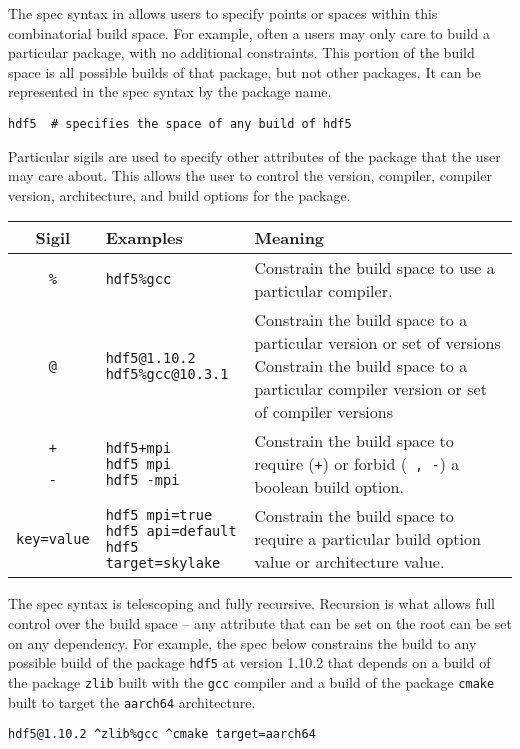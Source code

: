 The spec syntax in \spack allows users to specify points or spaces within this combinatorial build space.
For example, often a users may only care to build a particular package, with no additional constraints.
This portion of the build space is all possible builds of that package, but not other packages.
It can be represented in the spec syntax by the package name.
\begin{verbatim}
hdf5  # specifies the space of any build of hdf5
\end{verbatim}
Particular sigils are used to specify other attributes of the package that the user may care about. This allows the user to control the version, compiler, compiler version, architecture, and build options for the package.
\begin{tabular}{cll}
\hline
Sigil & Examples & Meaning \\
\hline
\texttt{\%} & \texttt{hdf5\%gcc} & Constrain the build space to use a particular compiler. \\
\hline
\texttt{@} & \shortstack{\texttt{hdf5@1.10.2} \\ \texttt{hdf5\%gcc@10.3.1}} & \shortstack{Constrain the build space to a particular version or set of versions \\ Constrain the build space to a particular compiler version or set of compiler versions} \\
\hline
\shortstack{\texttt{+} \\ \texttt{~} \\ \texttt{-}} & \shortstack{\texttt{hdf5+mpi} \\ \texttt{hdf5~mpi} \\ \texttt{hdf5 -mpi}} & Constrain the build space to require (\texttt{+}) or forbid (\texttt{~, -}) a boolean build option. \\
\hline
\texttt{key=value} & \shortstack{\texttt{hdf5 mpi=true} \\ \texttt{hdf5 api=default} \\ \texttt{hdf5 target=skylake}} & Constrain the build space to require a particular build option value or architecture value. \\
\end{tabular}


The spec syntax is telescoping and fully recursive.
Recursion is what allows full control over the build space -- any attribute that can be set on the root can be set on any dependency. For example, the spec below constrains the build to any possible build of the package \texttt{hdf5} at version 1.10.2 that depends on a build of the package \texttt{zlib} built with the \texttt{gcc} compiler and a build of the package \texttt{cmake} built to target the \texttt{aarch64} architecture.
\begin{verbatim}
hdf5@1.10.2 ^zlib%gcc ^cmake target=aarch64
\end{verbatim}

